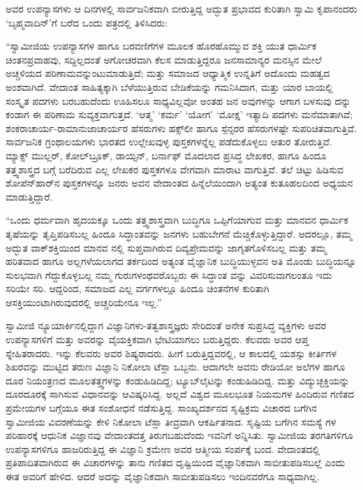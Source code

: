 ಅವರ ಉಪನ್ಯಾಸಗಳು ಆ ದಿನಗಳಲ್ಲಿ ಸಾರ್ವಜನಿಕವಾಗಿ ಬೀರುತ್ತಿದ್ದ ಅದ್ಭುತ ಪ್ರಭಾವದ ಕುರಿತಾಗಿ ಸ್ವಾಮಿ ಕೃಪಾನಂದರು ‘ಬೃಹ್ಮವಾದಿನ್​’ಗೆ ಬರೆದ ಒಂದು ಪತ್ರದಲ್ಲಿ ತಿಳಿಸಿದರು:

“ಸ್ವಾಮೀಜಿಯ ಉಪನ್ಯಾಸಗಳ ಹಾಗೂ ಬರವಣಿಗೆಗಳ ಮೂಲಕ ಹೊರಹೊಮ್ಮುವ ಶಕ್ತಿ ಯುತ ಧಾರ್ಮಿಕ ಚಿಂತನಪ್ರವಾಹವು, ಸದ್ದಿಲ್ಲದಂತೆ ಅಗೋಚರವಾಗಿ ಕೆಲಸ ಮಾಡುತ್ತಿದ್ದರೂ ಜನಸಾಮಾನ್ಯರ ಮನಸ್ಸಿನ ಮೇಲೆ ಅಚ್ಚಳಿಯದ ಪರಿಣಾಮವನ್ನುಂಟುಮಾಡುತ್ತಿದೆ; ಮತ್ತು ಸಮಾಜದ ಆಧ್ಯಾತ್ಮಿಕ ಉನ್ನತಿಗೆ ಅದೊಂದು ಮಹತ್ವದ ಅಂಶವಾಗಿದೆ. ವೇದಾಂತ ಸಾಹಿತ್ಯಕ್ಕಾಗಿ ಬೆಳೆಯುತ್ತಿರುವ ಬೇಡಿಕೆಯನ್ನು ಗಮನಿಸಿದಾಗ, ಮತ್ತು ಯಾರ ಬಾಯಲ್ಲಿ ಸಂಸ್ಕೃತ ಪದಗಳು ಬರಬಹುದೆಂದು ಊಹಿಸಲೂ ಸಾಧ್ಯವಿಲ್ಲವೋ ಅಂತಹ ಜನ ಅವುಗಳನ್ನು ಆಗಾಗ ಬಳಸುವು ದನ್ನು ಕಂಡಾಗ ಈ ಪರಿಣಾಮ ಸುವ್ಯಕ್ತವಾಗುತ್ತದೆ. ‘ಆತ್ಮ’ ‘ಕರ್ಮ’ ‘ಯೋಗ’ ‘ಮೋಕ್ಷ’ ಇತ್ಯಾದಿ ಪದಗಳು ಮನೆಮಾತಾಗಿವೆ; ಶಂಕರಾಚಾರ್ಯ-ರಾಮಾನುಜಾಚಾರ್ಯರ ಹೆಸರುಗಳು ಹಕ್ಸ್​ಲೀ ಹಾಗೂ ಸ್ಪೆನ್ಸರರ ಹೆಸರುಗಳಷ್ಟೇ ಸುಪರಿಚಿತವಾಗುತ್ತಿವೆ. ಸಾರ್ವಜನಿಕ ಗ್ರಂಥಾಲಯಗಳು ಭಾರತದ ಉಲ್ಲೇಖವುಳ್ಳ ಪುಸ್ತಕಗಳನ್ನೆಲ್ಲ ಪಡೆದುಕೊಳ್ಳಲು ಆತುರ ತೋರುತ್ತಿವೆ. ಮ್ಯಾಕ್ಸ್ ಮುಲ್ಲರ್, ಕೋಲ್​ಬ್ರೂಕ್, ಡಾಯ್ಸನ್, ಬರ್ನಾಫ್ ಮೊದಲಾದ ಪ್ರಸಿದ್ಧ ಲೇಖಕರ, ಹಾಗೂ ಹಿಂದೂ ತತ್ತ್ವಶಾಸ್ತ್ರದ ಬಗ್ಗೆ ಬರೆದಿರುವ ಎಲ್ಲ ಲೇಖಕರ ಪುಸ್ತಕಗಳೂ ವೇಗವಾಗಿ ಮಾರಾಟ ವಾಗುತ್ತಿವೆ. ತಲೆ ಚಿಟ್ಟು ಹಿಡಿಸುವ ಶೋಪೆನ್​ಹಾರ್​ನ ಪುಸ್ತಕಗಳನ್ನೂ ಜನರು ಅವನ ವೇದಾಂತದ ಹಿನ್ನೆಲೆಯಿಂದಾಗಿ ಅತ್ಯಂತ ಕುತೂಹಲದಿಂದ ಅಧ್ಯಯನ ಮಾಡುತ್ತಿದ್ದಾರೆ.

“ಒಂದು ಧರ್ಮವಾಗಿ ಹೃದಯಕ್ಕೂ ಒಂದು ತತ್ತ್ವಶಾಸ್ತ್ರವಾಗಿ ಬುದ್ಧಿಗೂ ಒಪ್ಪಿಗೆಯಾಗುವ ಮತ್ತು ಮಾನವನ ಧಾರ್ಮಿಕ ತೃಷೆಯನ್ನು ತೃಪ್ತಿಪಡಿಸಬಲ್ಲ ಹಿಂದೂ ಸಿದ್ಧಾಂತವನ್ನು ಜನಗಳು ಬಹುಬೇಗನೆ ಮೆಚ್ಚಿಕೊಳ್ಳುತ್ತಿದ್ದಾರೆ. ಅದರಲ್ಲೂ, ತಮ್ಮ ಅದ್ಭುತ ವಾಕ್​ಶಕ್ತಿಯಿಂದ ಮಾನವ ನಲ್ಲಿ ಸುಪ್ತವಾಗಿರುವ ದಿವ್ಯಪ್ರೇಮವನ್ನು ಜಾಗೃತಗೊಳಿಸಬಲ್ಲ ಮತ್ತು ತಮ್ಮ ಹರಿತವಾದ ಹಾಗೂ ಅಲ್ಲಗಳೆಯಲಾಗದ ತರ್ಕದಿಂದ ಅತ್ಯಂತ ವೈಜ್ಞಾನಿಕ ಬುದ್ಧಿಯುಳ್ಳವನ ಅತಿ ಮೊಂಡು ಬುದ್ಧಿಯನ್ನೂ ಸುಲಭವಾಗಿ ಗೆದ್ದುಕೊಳ್ಳಬಲ್ಲ ನಮ್ಮ ಗುರುಗಳಂಥವರೊಬ್ಬರು ಈ ಸಿದ್ಧಾಂತ ವನ್ನು ವಿವರಿಸುವಾಗಲಂತೂ ಇದು ಸರಿಯೇ ಸರಿ. ಆದ್ದರಿಂದ, ಸಮಾಜದ ಎಲ್ಲ ವರ್ಗಗಳಲ್ಲೂ ಹಿಂದೂ ಚಿಂತನೆಗಳ ಕುರಿತಾಗಿ ಆಸಕ್ತಿಯುಂಟಾಗಿರುವುದರಲ್ಲಿ ಅಚ್ಚರಿಯೇನೂ ಇಲ್ಲ.”

ಸ್ವಾಮೀಜಿ ನ್ಯೂಯಾರ್ಕಿನಲ್ಲಿದ್ದಾಗ ವಿಜ್ಞಾನಿಗಳು-ತತ್ವಶಾಸ್ತ್ರಜ್ಞರು ಸೇರಿದಂತೆ ಅನೇಕ ಸುಪ್ರಸಿದ್ಧ ವ್ಯಕ್ತಿಗಳು ಅವರ ಉಪನ್ಯಾಸಗಳಿಗೆ ಮತ್ತು ಅವರನ್ನು ವೈಯಕ್ತಿಕವಾಗಿ ಭೇಟಿಯಾಗಲು ಬರುತ್ತಿದ್ದರು. ಕೆಲವರು ಅವರ ಆಪ್ತ ಸ್ನೇಹಿತರಾದರು. ಇನ್ನು ಕೆಲವರು ಅವರ ಶಿಷ್ಯರಾದರು. ಹೀಗೆ ಬರುತ್ತಿದ್ದವರಲ್ಲಿ, ಆ ಕಾಲದಲ್ಲಿ ಯಶಸ್ಸು ಕೀರ್ತಿಗಳ ಶಿಖರವನ್ನು ಮುಟ್ಟಿದ ತರುಣ ವಿಜ್ಞಾನಿ ನಿಕೋಲಾ ಟೆಸ್ಲಾ ಒಬ್ಬನು. ಆದಾಗಲೇ ಅವನು ರೇಡಿಯೋ ಅಲೆಗಳ ಹಾಗೂ ದೂರ ನಿಯಂತ್ರಣದ ಮೂಲತತ್ತ್ವಗಳನ್ನು ಕಂಡುಹಿಡಿದಿದ್ದ; ಟ್ಯೂಬ್​ಲೈಟನ್ನು ಕಂಡುಹಿಡಿದಿದ್ದ. ಮತ್ತು ವಿದ್ಯುಚ್ಛಕ್ತಿಯನ್ನು ದೂರದೂರಕ್ಕೆ ಸಾಗಿಸುವ ವಿಧಾನವನ್ನು ಆವಿಷ್ಕರಿಸಿದ್ದ. ಅಲ್ಲದೆ ವಿಶ್ವದ ಮೂಲಭೂತ ನಿಯಮಗಳ ಹಿಂದಿರುವ ಗಣಿತದ ಪ್ರಮೇಯಗಳ ಬಗ್ಗೆಯೂ ಈತ ಸಂಶೋಧನೆ ನಡೆಸುತ್ತಿದ್ದ. ಸಾಂಖ್ಯದರ್ಶನದ ಸೃಷ್ಟಿಕ್ರಮ ವಿಚಾರದ ಬಗೆಗಿನ ಸ್ವಾಮೀಜಿಯ ವಿವರಣೆಯನ್ನು ಕೇಳಿ ನಿಕೋಲಾ ಟೆಸ್ಲಾ ತೀವ್ರವಾಗಿ ಆಕರ್ಷಿತನಾದ. ಸೃಷ್ಟಿಯ ಬಗೆಗಿನ ಸಮಸ್ಯೆ ಗಳ ಪರಿಹಾರಕ್ಕೆ ಆಧುನಿಕ ವಿಜ್ಞಾನವು ವೇದಾಂತದತ್ತ ತಿರುಗಬಹುದೆಂದು ಇವನಿಗೆ ಅನ್ನಿಸಿತು. ಸ್ವಾಮೀಜಿಯ ತರಗತಿಗಳಿಗೂ ಉಪನ್ಯಾಸಗಳಿಗೂ ಹಾಜರಿರುತ್ತಿದ್ದ ಈ ವಿಜ್ಞಾನಿ ಕ್ರಮೇಣ ಅವರ ಆತ್ಮೀಯ ಸಂರ್ಪಕ್ಕೆ ಬಂದ. ವೇದಾಂತದಲ್ಲಿ ಪ್ರತಿಪಾದಿತವಾಗಿರುವ ಈ ವಿಚಾರಗಳನ್ನು ತಾನು ಗಣಿತದ ದೃಷ್ಟಿಯಿಂದ ವೈಜ್ಞಾನಿಕವಾಗಿ ಸಾಬೀತುಪಡಿಸಬಲ್ಲೆ ಎಂದು ಈತ ಅವರಿಗೆ ಹೇಳಿದ. ಆದರೆ ಅದನ್ನು ವೈಜ್ಞಾನಿಕವಾಗಿ ಸಾಬೀತುಪಡಿಸಲು ಇಂದಿನವರೆಗೂ ಸಾಧ್ಯವಾಗಿಲ್ಲ.

